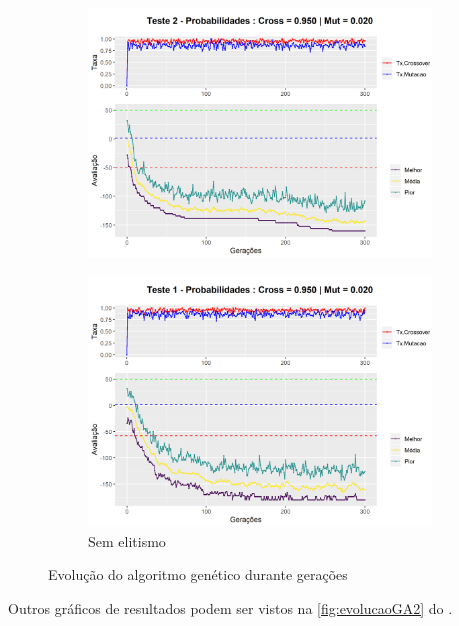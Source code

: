 \begin{figure}[ht]
\begin{subfigure}[b]{0.47\linewidth}
		\includegraphics[width=\linewidth]{imagens/graph_pc_0_950_pm_0_020_pop_50_g_300__2.png}
		\caption{}
	\end{subfigure}
	\begin{subfigure}[b]{0.47\linewidth}
		\includegraphics[width=\linewidth]{imagens/graph_pc_0_950_pm_0_020_pop_50_g_300__1_noelite.png}
		\caption{Sem elitismo}
	\end{subfigure}
\caption{Evolução do algoritmo genético durante gerações}
	\label{fig:evolucaoGA}
\end{figure}

Outros gráficos de resultados podem ser vistos na \autoref{fig:evolucaoGA2} do .